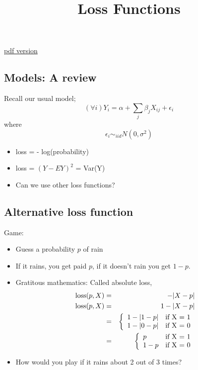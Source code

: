 \documentclass[20pt]{extarticle} %
\begin{document}
\title{Loss Functions}
\maketitle
\href{class_loss_functions.pdf}{pdf version}
\subsection*{Models: A review}
Recall our usual model;
\begin{displaymath}
(\forall i) Y_i = \alpha + \sum_j \beta_j X_{ij} + \epsilon_i
\end{displaymath}
where
\begin{displaymath}
\epsilon_i \sim_{iid} N(0,\sigma^2)
\end{displaymath}
\begin{itemize}
\item loss = - log(probability)
\item loss = $(Y -EY)^2$ = Var(Y)
\item Can we use other loss functions?
\end{itemize}
\subsection*{Alternative loss function}

Game:
\begin{itemize}
\item Guess a probability $p$ of rain
\item If it rains, you get paid $p$, if it doesn't rain you get $1-p$.
\item Gratitous mathematics: Called absolute loss,
\begin{eqnarray*}
\hbox{loss}(p,X) &= &-|X - p|\\
\hbox{loss}(p,X) &= &1 - |X - p|\\
& =& \left\{\begin{array}{l@{\quad}l}1-|1-p| &
\hbox{if X = 1}\\ 1-|0-p| & \hbox{if X = 0}
\end{array}
\right. \\
&= &\left\{\begin{array}{l@{\quad}l}p &
\hbox{if X = 1}\\ 1-p & \hbox{if X = 0}
\end{array}
\right.
\end{eqnarray*}
\item How would you play if it rains about 2 out of 3 times?
\end{itemize}
\end{document}
